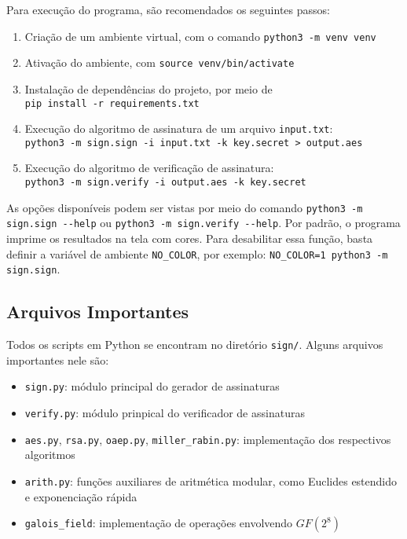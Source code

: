 \documentclass[a4paper, 10.5pt]{article}
\begin{document}
    Para execução do programa, são recomendados os seguintes passos:
    \begin{enumerate}
        \item Criação de um ambiente virtual, com o comando \verb|python3 -m venv venv|
        \item Ativação do ambiente, com \verb|source venv/bin/activate|
        \item Instalação de dependências do projeto, por meio de \\ \verb|pip install -r requirements.txt|
        \item Execução do algoritmo de assinatura de um arquivo
            \verb|input.txt|: \\ \verb|python3 -m sign.sign -i input.txt -k key.secret > output.aes|
        \item Execução do algoritmo de verificação de assinatura: \\
            \verb|python3 -m sign.verify -i output.aes -k key.secret|
    \end{enumerate}

    As opções disponíveis podem ser vistas por meio do comando \verb|python3 -m sign.sign --help| ou \verb|python3 -m sign.verify --help|.
    Por padrão, o programa imprime os resultados na tela com cores. Para
    desabilitar essa função, basta definir a variável de ambiente
    \verb|NO_COLOR|, por exemplo: \verb|NO_COLOR=1 python3 -m sign.sign|.

\subsection{Arquivos Importantes} %
\label{sec:arquivos}
    Todos os scripts em Python se encontram no diretório \verb|sign/|. Alguns
    arquivos importantes nele são:
    \begin{itemize}
        \item \verb|sign.py|: módulo principal do gerador de assinaturas
        \item \verb|verify.py|: módulo prinpical do verificador de assinaturas
        \item \verb|aes.py|, \verb|rsa.py|, \verb|oaep.py|,
            \verb|miller_rabin.py|: implementação dos respectivos algoritmos
        \item \verb|arith.py|: funções auxiliares de aritmética modular, como
            Euclides estendido e exponenciação rápida
        \item \verb|galois_field|: implementação de operações envolvendo
            $GF(2^8)$
    \end{itemize}
\end{document}
